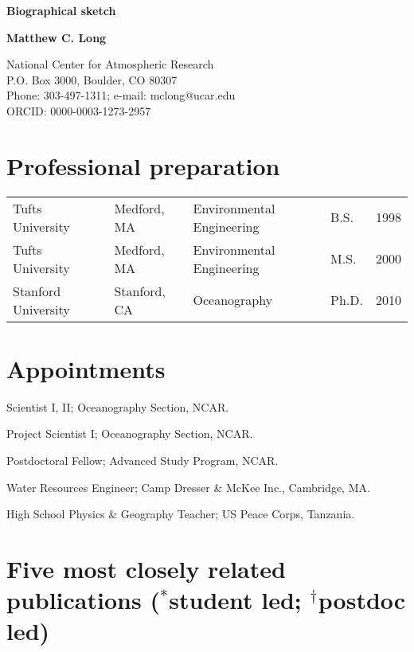 \documentclass[12pt]{article}
\begin{document}
\thispagestyle{empty}

\begin{center}
\noindent
\textbf{Biographical sketch}

\textbf{Matthew C. Long}

\noindent
National Center for Atmospheric Research\\
P.O. Box 3000, Boulder, CO 80307\\
Phone: 303-497-1311; e-mail: mclong@ucar.edu\\
ORCID: 0000-0003-1273-2957
\end{center}


\section{Professional preparation}

\begin{tabular}{lllll}
Tufts University	&	Medford, MA 	& Environmental Engineering	& B.S.	& 1998 	\\
Tufts University	&  	Medford, MA		& Environmental Engineering	& M.S.	& 2000	\\
Stanford University	&	Stanford, CA	& Oceanography				& Ph.D.	& 2010
\end{tabular}


\section{Appointments}

\begin{description}[style=multiline,leftmargin=2.8cm,font=\normalfont]
\setlength{\itemsep}{-0.5em}
\item[2014--present] {Scientist I, II}; Oceanography Section, NCAR.
\item[2012--2014] {Project Scientist I}; Oceanography Section, NCAR.
\item[2010--2012] {Postdoctoral Fellow}; {Advanced Study Program}, NCAR.
\item[2003--2004] {Water Resources Engineer}; {Camp Dresser \& McKee Inc.}, Cambridge, MA.
\item[2000--2002] {High School Physics \& Geography Teacher}; US Peace Corps, Tanzania.
\end{description}


\section{Five most closely related publications
{\footnotesize ($^*$student led; $^\dagger$postdoc led)}}
\end{document}
